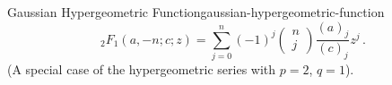 \begin{definition}{Gaussian Hypergeometric Function}{gaussian-hypergeometric-function}
  $${}_2 F_1(a,-n;c;z) = \sum_{j=0}^n (-1)^j \begin{pmatrix}n \\j\end{pmatrix} \frac{(a)_j}{(c)_j}z^j\,.$$
  (A special case of the hypergeometric series with $p=2$, $q=1$).
\end{definition}
